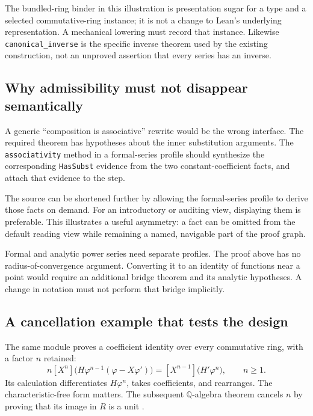 \documentclass[11pt,a4paper]{article}
\newcommand{\QQ}{\mathbb Q}
\newcommand{\codeid}[1]{\nolinkurl{#1}}
\begin{document}
The bundled-ring binder in this illustration is presentation sugar for a type and a selected commutative-ring instance; it is not a change to Lean's underlying representation. A mechanical lowering must record that instance. Likewise \codeid{canonical_inverse} is the specific inverse theorem used by the existing construction, not an unproved assertion that every series has an inverse.

\subsection{Why admissibility must not disappear semantically}

A generic ``composition is associative'' rewrite would be the wrong interface. The required theorem has hypotheses about the inner substitution arguments. The \codeid{associativity} method in a formal-series profile should synthesize the corresponding \codeid{HasSubst} evidence from the two constant-coefficient facts, and attach that evidence to the step.

The source can be shortened further by allowing the formal-series profile to derive those facts on demand. For an introductory or auditing view, displaying them is preferable. This illustrates a useful asymmetry: a fact can be omitted from the default reading view while remaining a named, navigable part of the proof graph.

Formal and analytic power series need separate profiles. The proof above has no radius-of-convergence argument. Converting it to an identity of functions near a point would require an additional bridge theorem and its analytic hypotheses. A change in notation must not perform that bridge implicitly.

\subsection{A cancellation example that tests the design}

The same module proves a coefficient identity over every commutative ring, with a factor $n$ retained:
\begin{equation}
 n[X^n]\bigl(H\varphi^{n-1}(\varphi-X\varphi')\bigr)
 =[X^{n-1}]\bigl(H'\varphi^n\bigr),\qquad n\ge1.
 \label{eq:jacobian}
\end{equation}
Its calculation differentiates $H\varphi^n$, takes coefficients, and rearranges. The characteristic-free form matters. The subsequent $\QQ$-algebra theorem cancels $n$ by proving that its image in $R$ is a unit \cite{srcseries}.
\end{document}
